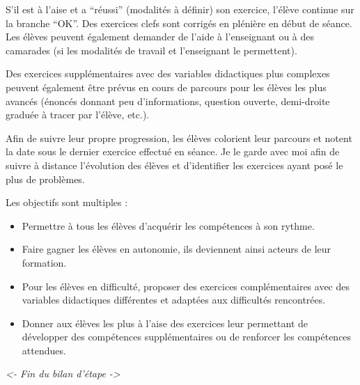 S’il est à l’aise et a “réussi” (modalités à définir) son exercice, l’élève continue sur la branche “OK”. Des exercices clefs sont corrigés en plénière en début de séance. Les élèves peuvent également demander de l’aide à l’enseignant ou à des camarades (si les modalités de travail et l’enseignant le permettent).

Des exercices supplémentaires avec des variables didactiques plus complexes peuvent également être prévus en cours de parcours pour les élèves les plus avancés (énoncés donnant peu d’informations, question ouverte, demi-droite graduée à tracer par l’élève, etc.).

Afin de suivre leur propre progression, les élèves colorient leur parcours et notent la date sous le dernier exercice effectué en séance. Je le garde avec moi afin de suivre à distance l’évolution des élèves et d’identifier les exercices ayant posé le plus de problèmes.

Les objectifs sont multiples : 
\begin{itemize}
    \item Permettre à tous les élèves d’acquérir les compétences à son rythme.
    \item Faire gagner les élèves en autonomie, ils deviennent ainsi acteurs de leur formation. 
    \item Pour les élèves en difficulté, proposer des exercices complémentaires avec des variables didactiques différentes et adaptées aux difficultés rencontrées.
    \item Donner aux élèves les plus à l’aise des exercices leur permettant de développer des compétences supplémentaires ou de renforcer les compétences attendues.
\end{itemize}

\textit{<- Fin du bilan d'étape ->}